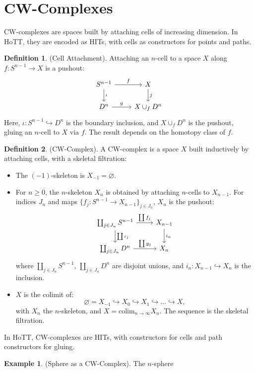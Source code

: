 \documentclass{article}
\theoremstyle{definition}
\newtheorem{definition}{Definition}
\newtheorem{example}{Example}
\newcommand*{\incmap}{\hookrightarrow}
\begin{document}
\section{CW-Complexes}
CW-complexes are spaces built by attaching cells of increasing
dimension. In HoTT, they are encoded as HITs, with cells as
constructors for points and paths.\begin{definition} (Cell Attachment). Attaching an \( n \)-cell
to a space \( X \) along \( f : S^{n-1} \to X \) is a pushout:
\[
\begin{tikzcd}
S^{n-1} \arrow[r, "f"] \arrow[d, "\iota"] & X \arrow[d, "j"] \\
D^n \arrow[r, "g"] & X \cup_f D^n
\end{tikzcd}
\]
Here, \( \iota : S^{n-1} \incmap D^n \) is the boundary
inclusion, and \( X \cup_f D^n \) is the pushout, gluing an
\( n \)-cell to \( X \) via \( f \). The result depends on the
homotopy class of \( f \).
\end{definition}\begin{definition} (CW-Complex). A CW-complex is a space \( X \)
built inductively by attaching cells, with a skeletal
filtration:
\begin{itemize}
    \item The \((-1)\)-skeleton is \( X_{-1} = \varnothing \).
    \item For \( n \geq 0 \), the \( n \)-skeleton \( X_n \) is
      obtained by attaching \( n \)-cells to \( X_{n-1} \). For
      indices \( J_n \) and maps \( \{ f_j : S^{n-1} \to X_{n-1}
      \}_{j \in J_n} \), \( X_n \) is the pushout:
    \[
    \begin{tikzcd}
    \coprod_{j \in J_n} S^{n-1} \arrow[r, "\coprod f_j"] \arrow[d, "\coprod \iota_j"] & X_{n-1} \arrow[d, "i_n"] \\
    \coprod_{j \in J_n} D^n \arrow[r, "\coprod g_j"] & X_n
    \end{tikzcd}
    \]
    where \( \coprod_{j \in J_n} S^{n-1} \), \( \coprod_{j \in
    J_n} D^n \) are disjoint unions, and \( i_n : X_{n-1}
    \incmap X_n \) is the inclusion.
    \item \( X \) is the colimit of:
    \[
    \varnothing = X_{-1} \incmap X_0 \incmap X_1 \incmap \dots
    \incmap X,
    \]
    with \( X_n \) the \( n \)-skeleton, and \( X = \text{colim}_{n
    \to \infty} X_n \). The sequence is the skeletal filtration.
\end{itemize}
In HoTT, CW-complexes are HITs, with constructors for cells and
path constructors for gluing.
\end{definition}\begin{example} (Sphere as a CW-Complex). The \( n \)-sphere

\end{example}
\end{document}
